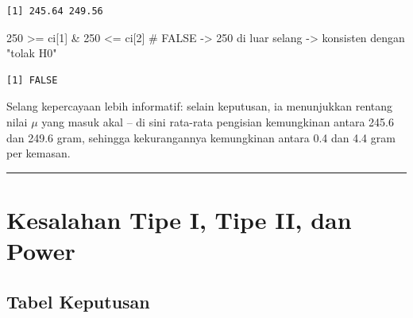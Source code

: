 \documentclass[
  indonesian,
  letterpaper,
]{book}
\newenvironment{Shaded}{\begin{snugshade}}{\end{snugshade}}
\newcommand{\CommentTok}[1]{\textcolor[rgb]{0.37,0.37,0.37}{#1}}
\newcommand{\DecValTok}[1]{\textcolor[rgb]{0.68,0.00,0.00}{#1}}
\newcommand{\NormalTok}[1]{\textcolor[rgb]{0.00,0.23,0.31}{#1}}
\newcommand{\SpecialCharTok}[1]{\textcolor[rgb]{0.37,0.37,0.37}{#1}}
\begin{document}
\begin{verbatim}
[1] 245.64 249.56
\end{verbatim}

\begin{Shaded}
\begin{Highlighting}[]
\DecValTok{250} \SpecialCharTok{\textgreater{}=}\NormalTok{ ci[}\DecValTok{1}\NormalTok{] }\SpecialCharTok{\&} \DecValTok{250} \SpecialCharTok{\textless{}=}\NormalTok{ ci[}\DecValTok{2}\NormalTok{]   }\CommentTok{\# FALSE {-}\textgreater{} 250 di luar selang {-}\textgreater{} konsisten dengan "tolak H0"}
\end{Highlighting}
\end{Shaded}

\begin{verbatim}
[1] FALSE
\end{verbatim}

Selang kepercayaan lebih informatif: selain keputusan, ia menunjukkan
rentang nilai \(\mu\) yang masuk akal -- di sini rata-rata pengisian
kemungkinan antara 245.6 dan 249.6 gram, sehingga kekurangannya
kemungkinan antara 0.4 dan 4.4 gram per kemasan.

\begin{center}\rule{0.5\linewidth}{0.5pt}\end{center}


\chapter{Kesalahan Tipe I, Tipe II, dan
Power}\label{kesalahan-tipe-i-tipe-ii-dan-power}

\section{Tabel Keputusan}\label{tabel-keputusan}
\end{document}
